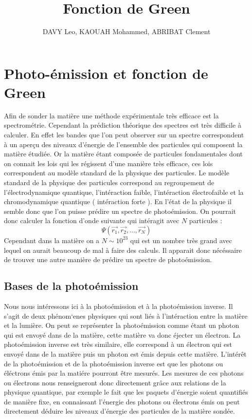 \documentclass[12pt]{article}
\title{Fonction de Green}
\author{DAVY Leo, KAOUAH Mohammed, ABRIBAT Clement}
\begin{document}
\maketitle
\section{Photo-\'emission et fonction de Green}

Afin de sonder la mati\`ere une m\'ethode exp\'erimentale tr\`es efficace est la spectrom\'etrie.
Cependant la pr\'ediction th\'eorique des spectres est tr\`es difficile \`a calculer. En effet
 les bandes que l'on peut observer sur un spectre correspondent \`a un aper\c cu des niveaux d'\'energie de 
 l'ensemble des particules qui composent la mati\`ere \'etudi\'ee. Or la mati\`ere \'etant compos\'ee de particules fondamentales
  dont on connait les lois qui les r\'egissent d'une mani\`ere tr\`es efficace, ces lois correspondent au mod\`ele standard de la physique des particules.
  Le mod\`ele standard de la physique des particules correspond au regroupement de l'\'electrodynamique quantique, l'int\'eraction faible,
   l'int\'eraction \'electrofaible et la chromodynamique quantique ( int\'eraction forte ).
   \newline
   En l'\'etat de la physique il semble donc que l'on puisse pr\'edire un spectre de photo\'emission. 
   On pourrait donc calculer la fonction d'onde suivante qui int\'eragit avec $N$ particules :
   \begin{equation}
    \Psi(\vec{r_1}, \vec{r_2}, ..., \vec{r_N})
   \end{equation}
    Cependant dans la mati\`ere on a $N \sim 10^{23}$ qui est un nombre tr\`es grand avec lequel on aurait beaucoup de mal
    \`a faire des calculs. Il apparait donc n\'ec\'essaire de trouver une autre mani\`ere de pr\'edire un spectre de photo\'emission.
\subsection{Bases de la photo\'emission}
Nous nous int\'eressons ici \`a la photo\'emission et \`a la photo\'emission inverse.
Il s'agit de deux ph\'enom`enes physiques qui sont li\'es \`a l'int\'eraction entre la mati\`ere
et la lumi\`ere.
\newline
On peut se repr\'esenter la photo\'emission comme \'etant un photon qui est envoy\'e dans de la mati\`ere,
cette mati\`ere va donc \'ejecter un \'electron. La photo\'emission inverse est tr\`es similaire, elle correspond \`a
un \'electron qui est envoy\'e dans de la mati\`ere puis un photon est \'emis depuis cette mati\`ere.
\newline
L'int\'er\^et de la photo\'emission et de la photo\'emission inverse est que les photons ou \'el\'ectrons
\'emis par la mati\'ere pourront \^etre mesur\'es. Les mesures de ces photons ou \'electrons nous renseigneront donc directement
gr\^ace aux relations de la physique quantique, par exemple le fait que les paquets d'\'energie soient quantifi\'es de mani\`ere fixe,
en connaissant l'\'energie des photons ou \'electrons \'emis on peut directement d\'eduire les niveaux d'\'energie des particules de la mati\`ere sond\'ee.
\end{document}
